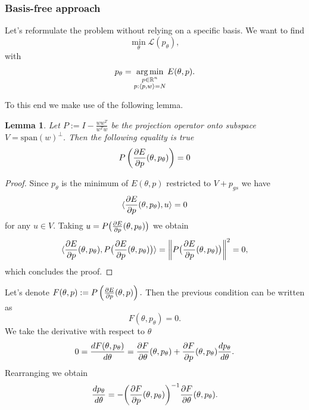 \documentclass[a4paper,10pt]{report}
\newtheorem{lemma}{Lemma}
\begin{document}
\subsubsection{Basis-free approach}
Let's reformulate the problem without relying on a specific basis.
We want to find
\begin{equation}
 \min_\theta \mathcal{L}(p_\theta),
\end{equation}
with
\begin{equation}
p_\theta = \operatorname*{arg\,min}_{\substack{p \in \mathbb{R}^n \\ p: \langle p, w\rangle=N }} E(\theta, p).
\end{equation}


 To this end we make use of the following lemma.

\begin{lemma}
 Let $P := I -\frac{ww^T}{w^Tw} $ be the projection operator onto subspace $V = \text{span}(w)^{\perp}$. Then the following equality is true
 \begin{equation}
  P\left(\frac{\partial E}{\partial p}(\theta, p_\theta)\right) = 0
 \end{equation}

\end{lemma}
\begin{proof}
  Since $p_\theta$ is the minimum of $E(\theta,p)$ restricted to $V+p_{gs}$ we have \[\langle \frac{\partial E}{\partial p}(\theta,p_{\theta}), u \rangle = 0\] for any $u\in V$. Taking $u = P\big( \frac{\partial E}{\partial p}(\theta,p_\theta)\big)$ we obtain
  \[\langle \frac{\partial E}{\partial p}(\theta,p_{\theta}), P\big( \frac{\partial E}{\partial p}(\theta,p_\theta)\big) \rangle = \left\|P\big( \frac{\partial E}{\partial p}(\theta,p_\theta)\big)\right\|^2=0,\]
  which concludes the proof.
\end{proof}

Let's denote $F(\theta,p) :=P \left(\frac{\partial E}{\partial p}(\theta,p)\right).$ Then the previous condition can be written as
\begin{equation}
 F(\theta,p_\theta) = 0.
\end{equation}
We take the derivative with respect to $\theta$
\begin{equation}
0=\frac{dF(\theta, p_\theta)}{d \theta} = \frac{\partial F}{\partial \theta}(\theta,p_\theta) + \frac{\partial F}{\partial p}(\theta,p_\theta) \frac{dp_\theta}{d \theta}.
\end{equation}
Rearranging we obtain
\begin{equation}
 \frac{d p_\theta}{d\theta} = - \bigg(\frac{\partial F}{\partial p}(\theta,p_\theta)\bigg)^{-1} \frac{\partial F}{\partial \theta}(\theta,p_\theta).
\end{equation}
\end{document}
